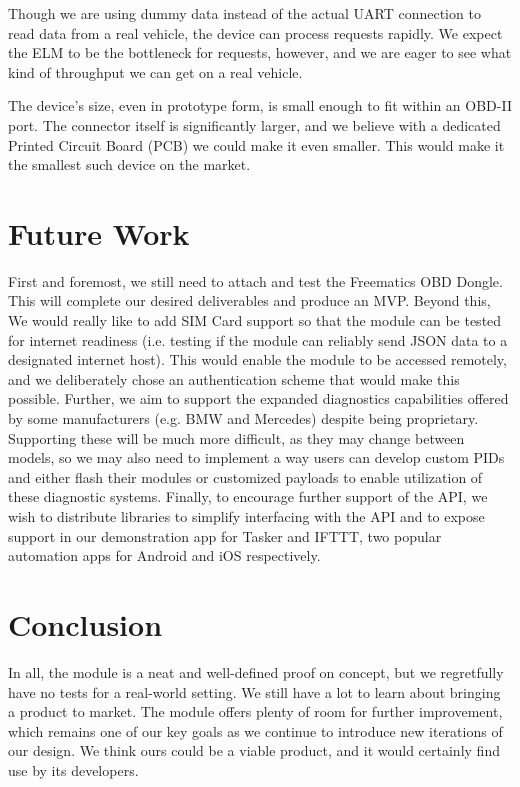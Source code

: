 \documentclass[10pt,letterpaper,unboxed,cm]{article}
\begin{document}
Though we are using dummy data instead of the actual UART connection to read data from a real vehicle, the device can process requests rapidly. We expect the ELM to be the bottleneck for requests, however, and we are eager to see what kind of throughput we can get on a real vehicle.

The device's size, even in prototype form, is small enough to fit within an OBD-II port. The connector itself is significantly larger, and we believe with a dedicated Printed Circuit Board (PCB) we could make it even smaller. This would make it the smallest such device on the market.

\section{Future Work}

First and foremost, we still need to attach and test the Freematics OBD Dongle. This will complete our desired deliverables and produce an MVP. Beyond this, We would really like to add SIM Card support so that the module can be tested for internet readiness (i.e. testing if the module can reliably send JSON data to a designated internet host). This would enable the module to be accessed remotely, and we deliberately chose an authentication scheme that would make this possible. Further, we aim to support the expanded diagnostics capabilities offered by some manufacturers (e.g. BMW and Mercedes) despite being proprietary. Supporting these will be much more difficult, as they may change between models, so we may also need to implement a way users can develop custom PIDs and either flash their modules or customized payloads to enable utilization of these diagnostic systems. Finally, to encourage further support of the API, we wish to distribute libraries to simplify interfacing with the API and to expose support in our demonstration app for Tasker and IFTTT, two popular automation apps for Android and iOS respectively.

\section{Conclusion}

In all, the module is a neat and well-defined proof on concept, but we regretfully have no tests for a real-world setting. We still have a lot to learn about bringing a product to market. The module offers plenty of room for further improvement, which remains one of our key goals as we continue to introduce new iterations of our design. We think ours could be a viable product, and it would certainly find use by its developers.
\end{document}
